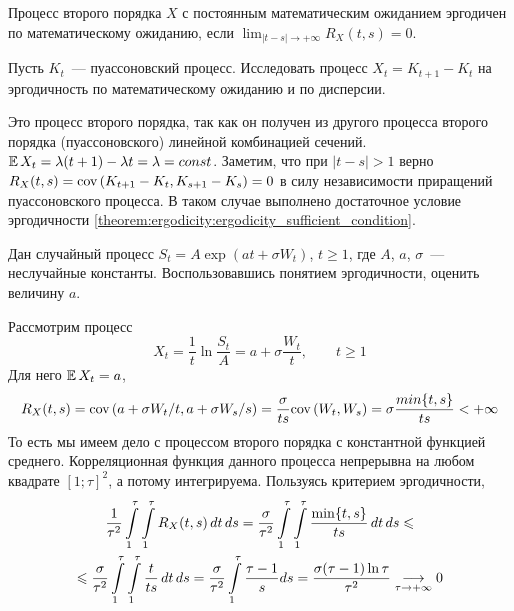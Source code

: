 \begin{theorem}
    \label{theorem:ergodicity:ergodicity_sufficient_condition}
    Процесс второго порядка $ X $ с постоянным математическим ожиданием эргодичен по математическому ожиданию,
    если $ \displaystyle \lim_{|t - s| \to +\infty} R_X(t, s) = 0 $.
\end{theorem}


\begin{exercise}
    \label{exercise:ergodicity:Poisson}
    Пусть $ K_t $~--- пуассоновский процесс.
    Исследовать процесс $ X_t = K_{t+1} - K_t $ на эргодичность по математическому ожиданию и по дисперсии.
\end{exercise}

\begin{solution}
    Это процесс второго порядка, так как он получен из другого процесса второго порядка (пуассоновского) линейной комбинацией сечений.
    $ \operatorname{\mathbb{E}} X_t = \lambda (t + 1) - \lambda t = \lambda = const $.
    Заметим, что при $ |t - s| > 1 $ верно $ R_X(t, s) = \textnormal{cov}\left(K_{t+1} - K_t, K_{s+1} - K_s\right) = 0 $
    в силу независимости приращений пуассоновского процесса.
    В таком случае выполнено достаточное условие эргодичности \ref{theorem:ergodicity:ergodicity_sufficient_condition}.
\end{solution}


\begin{exercise}
    \label{exercise:ergodicity:exp_process}
    Дан случайный процесс $ S_t = A \exp(at + \sigma W_t) $, $ t \geqslant 1 $,
    где $ A $, $ a $, $ \sigma $~--- неслучайные константы.
    Воспользовавшись понятием эргодичности, оценить величину $ a $.
\end{exercise}

\begin{solution}
    Рассмотрим процесс
    \[
        X_t = \frac{1}{t} \ln \frac{S_t}{A} = a + \sigma \frac{W_t}{t}, \qquad t \geqslant 1
    \]
    Для него $ \operatorname{\mathbb{E}} X_t = a $,
    \[
        R_X(t, s) = \textnormal{cov}\left(a + \sigma W_t / t, a + \sigma W_s / s\right) = \frac{\sigma}{t s} \textnormal{cov}\left(W_t, W_s\right) = \sigma \frac{min\{t, s\}}{t s} < +\infty
    \]
    То есть мы имеем дело с процессом второго порядка с константной функцией среднего.
    Корреляционная функция данного процесса непрерывна на любом квадрате $ [1;\tau]^2 $,
    а потому интегрируема.
    Пользуясь критерием эргодичности,
    \begin{multline*}
        \frac{1}{\tau^2} \int\limits_1^\tau \int\limits_1^\tau R_X(t,s) \, dt \, ds =
        \frac{\sigma}{\tau^2} \int\limits_1^\tau \int\limits_1^\tau \frac{\min\{t, s\}}{t s} \, dt \, ds \leqslant \\ \leqslant
        \frac{\sigma}{\tau^2} \int\limits_1^\tau \int\limits_1^\tau \frac{t}{t s} \, dt \, ds =
        \frac{\sigma}{\tau^2} \int\limits_1^\tau \frac{\tau - 1}{s} ds = \frac{\sigma (\tau - 1) \ln \tau}{\tau^2} \underset{\tau \to +\infty}{\longrightarrow} 0
    \end{multline*}
\end{solution}
